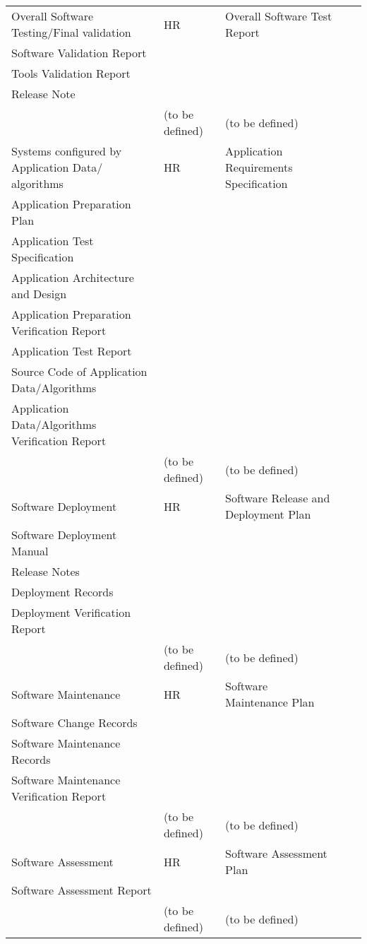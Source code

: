 \documentclass{template/openetcs_article}
\begin{document}
\begin{center}
\begin{longtable}{|m{2cm}|m{1cm}|m{7cm}|m{2cm}|m{2cm}|}
\\\hline
Overall Software Testing/Final validation &
\centering \gls{HR} &
\raggedright
Overall Software Test Report\\
Software Validation Report\\
Tools Validation Report\\ 
Release Note\\ &
(to be defined) &
(to be defined)
\\\hline
Systems configured by Application Data/ algorithms &
\centering \gls{HR} &
\raggedright
Application Requirements Specification\\
Application Preparation Plan\\
Application Test Specification\\ 
Application Architecture and Design\\ 
Application Preparation Verification Report\\ 
Application Test Report\\ 
Source Code of Application Data/Algorithms\\ 
Application Data/Algorithms Verification Report\\ &
(to be defined) &
(to be defined)
\\\hline
Software Deployment &
\centering \gls{HR} &
\raggedright
Software Release and Deployment Plan\\
Software Deployment Manual\\
Release Notes\\ 
Deployment Records\\ 
Deployment Verification Report\\ &
(to be defined) &
(to be defined)
\\\hline
Software Maintenance &
\centering \gls{HR} &
\raggedright
Software Maintenance Plan\\
Software Change Records\\
Software Maintenance Records\\ 
Software Maintenance Verification Report\\ &
(to be defined) &
(to be defined)
\\\hline
Software Assessment &
\centering \gls{HR} &
\raggedright
Software Assessment Plan\\ 
Software Assessment Report\\ &
(to be defined) &
(to be defined)
\\\hline
\end{longtable}
\end{center}
\end{document}
